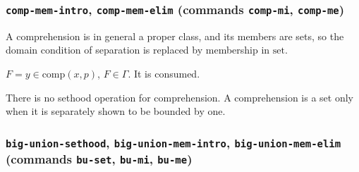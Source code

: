 \subsubsection*{\texttt{comp-mem-intro}, \texttt{comp-mem-elim}
  (commands \texttt{comp-mi}, \texttt{comp-me})}

A comprehension is in general a proper class, and its members are sets,
so the domain condition of separation is replaced by membership in
$\mathrm{set}$.
\label{kop:comp-mem-intro}%
\label{kop:comp-mem-elim}%
\begin{VNBcond}
\item[Assumption] $F = y \in \mathrm{comp}(x,p)$, $F \in \Gamma$.  It is
  consumed.
\end{VNBcond}
There is no sethood operation for comprehension.  A comprehension is a
set only when it is separately shown to be bounded by one.

\subsubsection*{\texttt{big-union-sethood}, \texttt{big-union-mem-intro},
  \texttt{big-union-mem-elim}
  (commands \texttt{bu-set}, \texttt{bu-mi}, \texttt{bu-me})}

